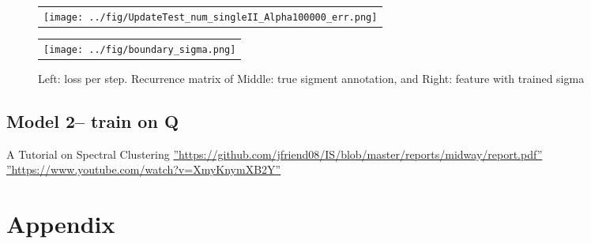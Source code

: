 \documentclass[final]{siamltexmm}
\begin{document}
\begin{figure}[H]
\centering
\begin{subfigure}
  \begin{tabular}{c}
  \texttt{[image: ../fig/UpdateTest\_num\_singleII\_Alpha100000\_err.png]}
  \end{tabular}{}
\end{subfigure}
  \begin{tabular}{c}
  \texttt{[image: ../fig/boundary\_sigma.png]}
  \end{tabular}{}
\begin{subfigure}
\end{subfigure}
\caption{Left: loss per step. Recurrence matrix of Middle: true sigment annotation, and Right: feature with trained sigma }
\end{figure}

\subsection{Model 2-- train on Q}

\begin{thebibliography}{10}
 {\sc A Tutorial on Spectral Clustering}
 \hyperref[baseline]{''https://github.com/jfriend08/IS/blob/master/reports/midway/report.pdf''}
 \hyperref[baseline]{''https://www.youtube.com/watch?v=XmyKnymXB2Y''}
\end{thebibliography}

\section{Appendix}
\end{document}
